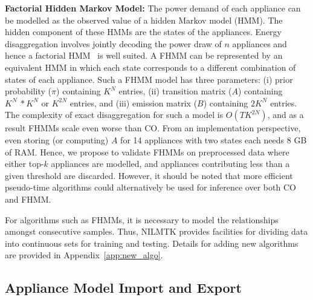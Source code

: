 \documentclass{sig-alternate}
\newcommand{\redcolor}[1]{\textcolor{red}{#1}}
\newcommand{\appref}[1]{Appendix~\ref{#1}}
\begin{document}
\textbf{Factorial Hidden Markov Model:} The power demand of each appliance can be modelled as the observed value of a hidden Markov model (HMM). The hidden component of these HMMs are the states of the appliances. Energy disaggregation involves jointly decoding the power draw of $n$ appliances and hence a factorial HMM~\cite{fhmm} is well suited. A FHMM can be represented by an equivalent HMM in which each state corresponds to a different combination of states of each appliance. Such a FHMM model has three parameters: (i) prior probability ($\pi$) containing $K^N$ entries, (ii) transition matrix ($A$) containing $K^N~*K^N$ or $K^{2N}$ entries, and (iii) emission matrix ($B$) containing $2K^N$ entries. The complexity of exact disaggregation for such a model is $O(TK^{2N})$, and as a result FHMMs scale even worse than CO. From an implementation perspective, even storing (or computing) $A$ for 14 appliances with two states each needs 8 GB of RAM. Hence, we propose to validate FHMMs on preprocessed data where either top-$k$ appliances are modelled, and appliances contributing less than a given threshold are discarded. However, it should be noted that more efficient pseudo-time algorithms could alternatively be used for inference over both CO and FHMM.

For algorithms such as FHMMs, it is necessary to model the relationships amongst consecutive samples. Thus, NILMTK provides facilities for dividing data into continuous sets for training and testing. Details for adding new algorithms are provided in \appref{app:new_algo}.

\subsection{Appliance Model Import and Export}

\end{document}
